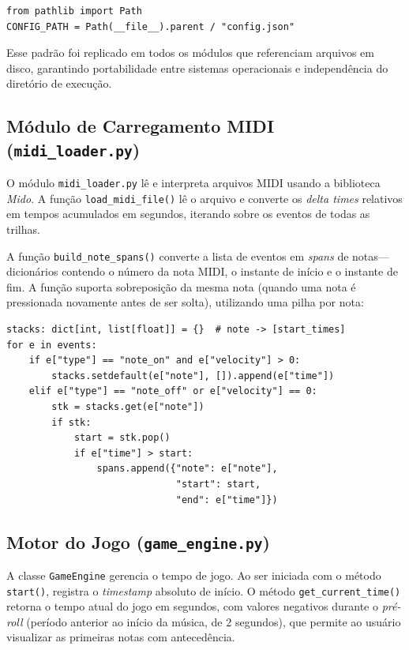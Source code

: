 \documentclass[
  12pt,
  openright,
  twoside,
  a4paper,
  english,
  brazil
]{abntex2}
\begin{document}
\begin{lstlisting}[caption={Definição de caminho absoluto com pathlib.},
                   label={lst:config-path}]
from pathlib import Path
CONFIG_PATH = Path(__file__).parent / "config.json"
\end{lstlisting}

Esse padrão foi replicado em todos os módulos que referenciam arquivos
em disco, garantindo portabilidade entre sistemas operacionais e
independência do diretório de execução.

\subsection{Módulo de Carregamento MIDI (\texttt{midi\_loader.py})}

O módulo \texttt{midi\_loader.py} lê e interpreta arquivos MIDI usando
a biblioteca \textit{Mido}. A função \texttt{load\_midi\_file()} lê o
arquivo e converte os \textit{delta times} relativos em tempos
acumulados em segundos, iterando sobre os eventos de todas as trilhas.

A função \texttt{build\_note\_spans()} converte a lista de eventos em
\textit{spans} de notas---dicionários contendo o número da nota MIDI, o
instante de início e o instante de fim. A função suporta sobreposição
da mesma nota (quando uma nota é pressionada novamente antes de ser
solta), utilizando uma pilha por nota:

\begin{lstlisting}[caption={Trecho da função build\_note\_spans().},
                   label={lst:spans}]
stacks: dict[int, list[float]] = {}  # note -> [start_times]
for e in events:
    if e["type"] == "note_on" and e["velocity"] > 0:
        stacks.setdefault(e["note"], []).append(e["time"])
    elif e["type"] == "note_off" or e["velocity"] == 0:
        stk = stacks.get(e["note"])
        if stk:
            start = stk.pop()
            if e["time"] > start:
                spans.append({"note": e["note"],
                              "start": start,
                              "end": e["time"]})
\end{lstlisting}

\subsection{Motor do Jogo (\texttt{game\_engine.py})}

A classe \texttt{GameEngine} gerencia o tempo de jogo. Ao ser iniciada
com o método \texttt{start()}, registra o \textit{timestamp} absoluto
de início. O método \texttt{get\_current\_time()} retorna o tempo atual
do jogo em segundos, com valores negativos durante o \textit{pré-roll}
(período anterior ao início da música, de 2 segundos), que permite ao
usuário visualizar as primeiras notas com antecedência.
\end{document}
